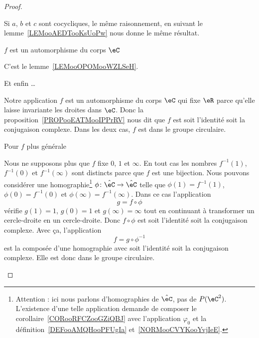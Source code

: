 \begin{proof}
\begin{subproof}
\begin{subproof}
                     Si \( a\), \( b\) et \( c\) sont cocycliques, le même raisonnement, en suivant le lemme~\ref{LEMooAEDTooKsUoPw} nous donne le même résultat.

                 \item[\( f\) est un automorphisme du corps \( \eC\)]

                     C'est le lemme~\ref{LEMooOPOMooWZLSeH}.

                 \item[Et enfin \ldots]

                     Notre application \( f\) est un automorphisme du corps \( \eC\) qui fixe \( \eR\) parce qu'elle laisse invariante les droites dans \( \eC\). Donc la proposition~\ref{PROPooEATMooIPPrRV} nous dit que \( f\) est soit l'identité soit la conjugaison complexe. Dans les deux cas, \( f\) est dans le groupe circulaire.

            \end{subproof}

        \item[Pour \( f\) plus générale]

            Nous ne supposons plus que $f$ fixe \( 0\), \( 1\) et \( \infty\). En tout cas les nombres \( f^{-1}(1)\), \( f^{-1}(0)\) et \( f^{-1}(\infty)\) sont distincts parce que \( f\) est une bijection. Nous pouvons considérer une homographie\footnote{Attention : ici nous parlons d'homographies de \( \hat \eC\), pas de \( P(\eC^2)\). L'existence d'une telle application demande de composer le corollaire~\ref{CORooRFCZooGZiQBJ} avec l'application \( \varphi_0\) et la définition~\ref{DEFooAMQHooPFUgIa} et~\ref{NORMooCVYKooYvjIeE}.} \( \phi\colon \hat \eC\to \hat \eC\) telle que \( \phi(1)=f^{-1}(1)\), \( \phi(0)=f^{-1}(0)\) et \( \phi(\infty)=f^{-1}(\infty)\). Dans ce cas l'application
            \begin{equation}
                g=f\circ\phi
            \end{equation}
            vérifie \( g(1)=1\), \( g(0)=1\) et \( g(\infty)=\infty\) tout en continuant à transformer un cercle-droite en un cercle-droite. Donc \( f\circ\phi\) est soit l'identité soit la conjugaison complexe. Avec ça, l'application
            \begin{equation}
                f=g\circ\phi^{-1}
            \end{equation}
            est la composée d'une homographie avec soit l'identité soit la conjugaison complexe. Elle est donc dans le groupe circulaire.
    \end{subproof}
\end{proof}


